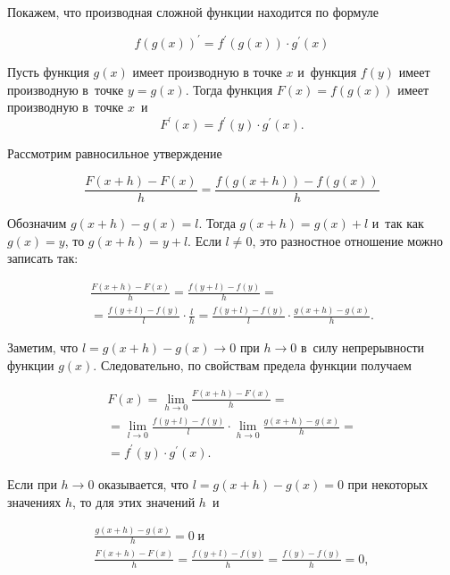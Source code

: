 
Покажем, что производная сложной функции находится по формуле

\begin{equation}\label{eq:5_3_1}
f(g(x))^\prime = f^\prime(g(x)) \cdot g^\prime(x)
\end{equation}

\begin{Th}\label{th:5_3_1}
Пусть функция $g(x)$ имеет производную в точке $x$ и~функция $f(y)$ имеет производную
в~точке $y=g(x)$. Тогда функция $F(x) = f(g(x))$ имеет производную в~точке $x$~и
\begin{equation}\label{eq:5_3_2}
F^\prime(x) = f^\prime(y) \cdot g^\prime(x).
\end{equation}
\end{Th}

Рассмотрим равносильное утверждение

\begin{equation*}
\displaystyle \frac{F(x+h) - F(x)}{h} = \frac{f(g(x+h)) - f(g(x))}{h}
\end{equation*}

Обозначим $g(x+h) - g(x) = l$. Тогда $g(x+h) = g(x) + l$ и~так как $g(x) = y$,
то $g(x+h) = y + l$. Если $l \ne 0$, это разностное отношение можно
записать так:

\begin{multline*}
\displaystyle
\frac{F(x+h) - F(x)}{h} =
\frac{f(y+l) - f(y)}{h} = \\
= \frac{f(y+l) - f(y)}{l} \cdot \frac{l}{h} =
\frac{f(y+l) - f(y)}{l} \cdot \frac{g(x+h) - g(x)}{h}.
\end{multline*}

Заметим, что $l = g(x+h) - g(x) \to 0$ при $h \to 0$ в~силу непрерывности функции $g(x)$.
Следовательно, по свойствам предела функции получаем

\begin{multline*}
\displaystyle F(x) =
\lim_{h \to 0} \frac{F(x+h) - F(x)}{h} = \\
= \lim_{l \to 0} \frac{f(y+l) - f(y)}{l} \cdot \lim_{h \to 0} \frac{g(x+h) - g(x)}{h} = \\
= f^\prime(y) \cdot g^\prime(x).
\end{multline*}

Если при $h \to 0$ оказывается, что $l = g(x+h) - g(x) = 0$ при некоторых значениях $h$,
то для этих значений $h$~и

\begin{gather*}
\displaystyle \frac{g(x+h) - g(x)}{h} = 0 \; \text{и} \\
\displaystyle \frac{F(x+h) - F(x)}{h} = \frac{f(y+l) - f(y)}{h} = \frac{f(y) - f(y)}{h} = 0,
\end{gather*}

